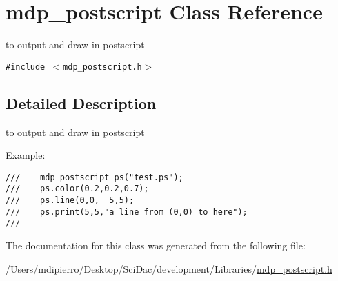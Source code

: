 \hypertarget{classmdp__postscript}{
\section{mdp\_\-postscript Class Reference}
\label{classmdp__postscript}
}
to output and draw in postscript  


{\tt \#include $<$mdp\_\-postscript.h$>$}



\subsection{Detailed Description}
to output and draw in postscript 

Example: 

\footnotesize\begin{verbatim}
///    mdp_postscript ps("test.ps");
///    ps.color(0.2,0.2,0.7);
///    ps.line(0,0,  5,5);
///    ps.print(5,5,"a line from (0,0) to here");
/// \end{verbatim}
\normalsize
 

The documentation for this class was generated from the following file:\begin{CompactItemize}
\item 
/Users/mdipierro/Desktop/SciDac/development/Libraries/\hyperlink{mdp__postscript_8h}{mdp\_\-postscript.h}\end{CompactItemize}

